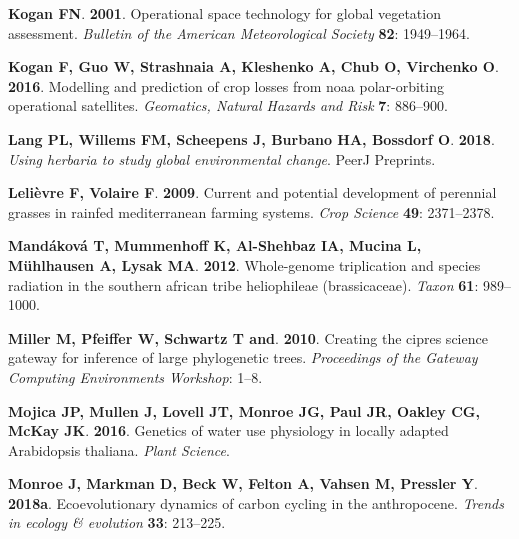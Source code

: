 \documentclass[man,floatsintext]{apa6}
\theoremstyle{definition}
\theoremstyle{definition}
\theoremstyle{definition}
\theoremstyle{remark}
\begin{document}
\leavevmode\hypertarget{ref-kogan2001operational}{}%
\textbf{\textnormal{Kogan FN}}. \textbf{2001}. Operational space
technology for global vegetation assessment. \emph{Bulletin of the
American Meteorological Society} \textbf{82}: 1949--1964.

\leavevmode\hypertarget{ref-kogan2016modelling}{}%
\textbf{\textnormal{Kogan F}, \textnormal{Guo W}, \textnormal{Strashnaia
A}, \textnormal{Kleshenko A}, \textnormal{Chub O}, \textnormal{Virchenko
O}}. \textbf{2016}. Modelling and prediction of crop losses from noaa
polar-orbiting operational satellites. \emph{Geomatics, Natural Hazards
and Risk} \textbf{7}: 886--900.

\leavevmode\hypertarget{ref-lang2018using}{}%
\textbf{\textnormal{Lang PL}, \textnormal{Willems FM},
\textnormal{Scheepens J}, \textnormal{Burbano HA}, \textnormal{Bossdorf
O}}. \textbf{2018}. \emph{Using herbaria to study global environmental
change}. PeerJ Preprints.

\leavevmode\hypertarget{ref-lelievre2009current}{}%
\textbf{\textnormal{Lelièvre F}, \textnormal{Volaire F}}. \textbf{2009}.
Current and potential development of perennial grasses in rainfed
mediterranean farming systems. \emph{Crop Science} \textbf{49}:
2371--2378.

\leavevmode\hypertarget{ref-mandakova2012whole}{}%
\textbf{\textnormal{Mandáková T}, \textnormal{Mummenhoff K},
\textnormal{Al-Shehbaz IA}, \textnormal{Mucina L},
\textnormal{Mühlhausen A}, \textnormal{Lysak MA}}. \textbf{2012}.
Whole-genome triplication and species radiation in the southern african
tribe heliophileae (brassicaceae). \emph{Taxon} \textbf{61}: 989--1000.

\leavevmode\hypertarget{ref-miller2010creating}{}%
\textbf{\textnormal{Miller M}, \textnormal{Pfeiffer W},
\textnormal{Schwartz T and}}. \textbf{2010}. Creating the cipres science
gateway for inference of large phylogenetic trees. \emph{Proceedings of
the Gateway Computing Environments Workshop}: 1--8.

\leavevmode\hypertarget{ref-Mojica2016}{}%
\textbf{\textnormal{Mojica JP}, \textnormal{Mullen J},
\textnormal{Lovell JT}, \textnormal{Monroe JG}, \textnormal{Paul JR},
\textnormal{Oakley CG}, \textnormal{McKay JK}}. \textbf{2016}. Genetics
of water use physiology in locally adapted Arabidopsis thaliana.
\emph{Plant Science}.

\leavevmode\hypertarget{ref-monroe2018ecoevolutionary}{}%
\textbf{\textnormal{Monroe J}, \textnormal{Markman D}, \textnormal{Beck
W}, \textnormal{Felton A}, \textnormal{Vahsen M}, \textnormal{Pressler
Y}}. \textbf{2018a}. Ecoevolutionary dynamics of carbon cycling in the
anthropocene. \emph{Trends in ecology \& evolution} \textbf{33}:
213--225.
\end{document}
